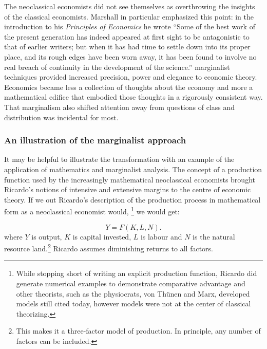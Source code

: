The neoclassical economists did not see themselves as overthrowing the insights of the classical economists. Marshall in particular emphasized this point: in the introduction to his \textit{Principles of Economics} he wrote ``Some of the best work of the present generation has indeed appeared at first sight to be antagonistic to that of earlier writers; but when it has had time to settle down into its proper place, and its rough edges have been worn away, it has been found to involve no real breach of continuity in the development of the science.'' \Gls{marginalist} techniques provided increased precision, power and elegance to economic theory. Economics became less a collection of thoughts about the economy and more a mathematical edifice that embodied those thoughts in a rigorously consistent way.  That \gls{marginalism} also shifted attention away from questions of class and distribution was incidental for most.  

\subsubsection{An illustration of the marginalist approach}
It may be helpful to illustrate the transformation with an example of the application of mathematics and marginalist analysis. The concept of a production function used by the increasingly mathematical neoclassical economists brought Ricardo's notions of intensive and extensive margins to the centre of economic theory. If we out Ricardo's description of the production process  in mathematical form  as a neoclassical economist would, \footnote{
While stopping short of writing an explicit production function, Ricardo did generate numerical examples to demonstrate comparative advantage and other theorists, such as the physiocrats, von Th\"unen and Marx, developed models still cited today, however models were not at the center of classical theorizing.} we would get:

\begin{equation} 
Y=F(K,L,N).
\label{eqn-production-ricardo}
\end{equation} 
where $Y$ is output, $K$ is capital invested, $L$ is labour and $N$ is the natural resource land.\footnote{This makes it a three-factor model of production.  In principle, any number of factors can be included.}  Ricardo assumes diminishing returns to all factors. 

